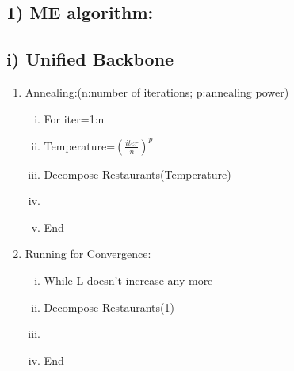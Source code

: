 \documentclass{article}
\begin{document}
\begin{spacing}{1.1}
\newpage

\section{1) ME algorithm: }
\subsection{i) Unified Backbone}
\begin{enumerate}[(1)]
\item Annealing:(n:number of iterations; p:annealing power)
\begin{enumerate}[(i)]
\item For iter=1:n
\item Temperature=$(\frac{iter}{n})^p$
\item Decompose Restaurants(Temperature)
\item {\color{red}{Merge Dish(Temperature)}}
\item End
\end{enumerate}
\item Running for Convergence:
\begin{enumerate}[(i)]
\item While L doesn't increase any more
\item Decompose Restaurants(1)
\item {\color{red}{Merge Dish(1)}}
\item End
\end{enumerate}
\end{enumerate}


\end{spacing}
\end{document}
